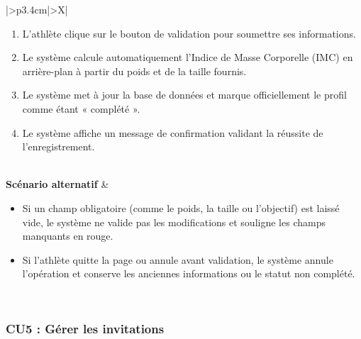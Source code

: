 \documentclass[a4paper,12pt]{report}
\begin{document}
\begin{table}[H]
\begin{tabularx}{\textwidth}{|>{\RaggedRight\arraybackslash}p{3.4cm}|>{\RaggedRight\arraybackslash}X|}
\begin{minipage}[t]{\linewidth}
\begin{enumerate}[label=\arabic*., leftmargin=*, topsep=0pt, itemsep=1pt]
    \begin{itemize}[leftmargin=*, topsep=1pt, itemsep=1pt]
        \item \textbf{Première configuration} : le système affiche un questionnaire vide. L'athlète remplit ses informations obligatoires (âge, taille, poids, objectif principal, etc.). 
        \item \textbf{Mise à jour} : le système affiche le formulaire pré-rempli avec les anciennes données. L'athlète modifie uniquement les informations souhaitées. 
    \end{itemize}
    \item L'athlète clique sur le bouton de validation pour soumettre ses informations.
    \item Le système calcule automatiquement l'Indice de Masse Corporelle (IMC) en arrière-plan à partir du poids et de la taille fournis.
    \item Le système met à jour la base de données et marque officiellement le profil comme étant « complété ».
    \item Le système affiche un message de confirmation validant la réussite de l'enregistrement.
\end{enumerate}
\vspace{2pt}
\end{minipage} \\
\hline
\textbf{Scénario alternatif} &
\begin{minipage}[t]{\linewidth}
\vspace{2pt}
\begin{itemize}[leftmargin=*, topsep=0pt, itemsep=1pt]
    \item Si un champ obligatoire (comme le poids, la taille ou l'objectif) est laissé vide, le système ne valide pas les modifications et souligne les champs manquants en rouge.
    \item  Si l'athlète quitte la page ou annule avant validation, le système annule l'opération et conserve les anciennes informations ou le statut non complété.
\end{itemize}
\vspace{2pt}
\end{minipage} \\
\hline
\end{tabularx}
\end{table}

\subsubsection*{CU5 : Gérer les invitations}
\end{document}
